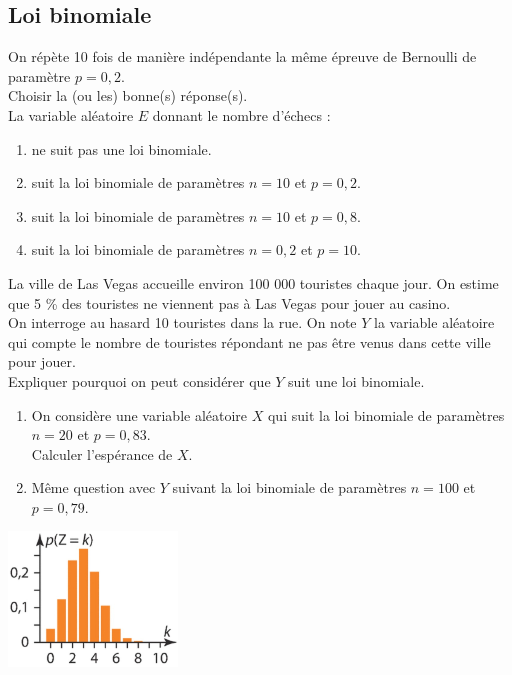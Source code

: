 \documentclass[a4paper,11pt,exos]{nsi} %
\begin{document}
\subsection*{Loi binomiale}

\exo{}
On répète 10 fois de manière indépendante la même épreuve de Bernoulli de paramètre $p=0,2$.\\
Choisir la (ou les) bonne(s) réponse(s).\\
La variable aléatoire $E$ donnant le nombre d'échecs :
\begin{enumerate}[label=\ding{111}]
    \item ne suit pas une loi binomiale.
    \item suit la loi binomiale de paramètres $n=10$ et $p=0,2$.
    \item suit la loi binomiale de paramètres $n=10$ et $p=0,8$.
    \item suit la loi binomiale de paramètres $n=0,2$ et $p=10$.
\end{enumerate}


\exo{}
La ville de Las Vegas accueille environ 100 000 touristes chaque jour. On estime que 5 \% des touristes ne viennent pas à Las Vegas  pour jouer au casino.\\
On interroge au hasard 10 touristes dans la rue. On note $Y$ la variable aléatoire qui compte le nombre de touristes répondant ne pas être venus dans cette ville pour jouer.\\
Expliquer pourquoi on peut considérer que $Y$ suit une loi binomiale.\\

\exo{}
\begin{enumerate}
    \item On considère une variable aléatoire $X$ qui suit la loi binomiale de paramètres $n=20$ et $p=0,83$.\\
    Calculer l'espérance de $X$.
    \item Même question avec $Y$ suivant la loi binomiale de paramètres $n=100$ et $p=0,79$.
\end{enumerate}

{\includegraphics[width=4.5cm]{diagramme1.jpg}}
\end{document}

